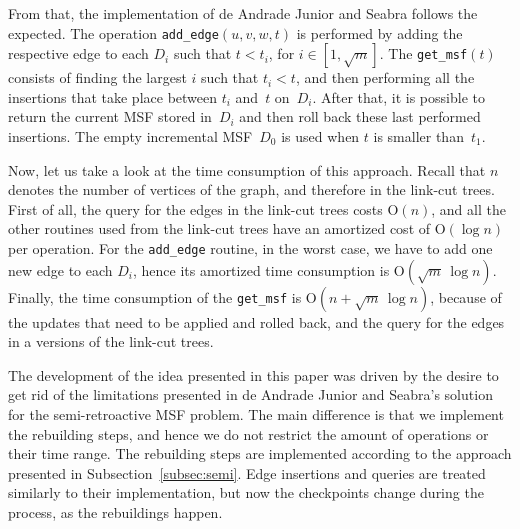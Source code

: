 \documentclass[3p,times,procedia]{elsarticle}
\newcommand{\Oh}{\mathrm{O}}
\begin{document}
From that, the implementation of de Andrade Junior and Seabra follows 
the expected.  The operation \texttt{add\_edge}$(u,v,w,t)$ is performed 
by adding the respective edge to each $D_i$ such that $t < t_i$, for
$i \in [1,\sqrt{m}]$.  The \texttt{get\_msf}$(t)$ consists of finding 
the largest $i$ such that $t_i < t$, and then performing all the 
insertions that take place between $t_i$ and~$t$ on~$D_i$.
After that, it is possible to return the current MSF stored 
in~$D_i$ and then roll back these last performed insertions.
The empty incremental MSF~$D_0$ is used when $t$ is smaller than~$t_1$.

Now, let us take a look at the time consumption of this approach.
Recall that $n$ denotes the number of vertices of the graph, 
and therefore in the link-cut trees.  First of all, the query for 
the edges in the link-cut trees costs $\Oh(n)$, and all the other 
routines used from the link-cut trees have an amortized cost of 
$\Oh(\log{n})$ per operation.  For the \texttt{add\_edge} routine, 
in the worst case, we have to add one new edge to each $D_i$, hence 
its amortized time consumption is $\Oh(\sqrt{m}\,\log{n})$. Finally, 
the time consumption of the \texttt{get\_msf} is $\Oh(n+\sqrt{m}\,\log{n})$,
because of the updates that need to be applied and rolled back, 
and the query for the edges in a versions of the link-cut trees.

\medskip

The development of the idea presented in this paper was driven by
the desire to get rid of the limitations presented in de Andrade 
Junior and Seabra's solution for the semi-retroactive MSF problem.  
The main difference is that we implement the rebuilding steps, 
and hence we do not restrict the amount of operations or their time range.
The rebuilding steps are implemented according to 
the approach presented in Subsection~\ref{subsec:semi}.
Edge insertions and queries are treated similarly to their implementation, 
but now the checkpoints change during the process, as the rebuildings happen.

\medskip
\end{document}
